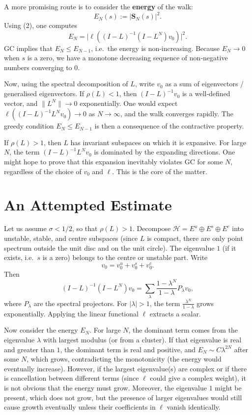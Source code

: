 \documentclass[11pt,a4paper]{article}
\begin{document}
A more promising route is to consider the \textbf{energy} of the walk:
\[
E_N(s) := |\mathbf{S}_N(s)|^2.
\]
Using (2), one computes
\[
E_N = \bigl| \ell( (I - L)^{-1} (I - L^{N}) v_0 ) \bigr|^2.
\tag{7}
\]
GC implies that $E_N \le E_{N-1}$, i.e.\ the energy is non‑increasing.  Because $E_N \to 0$ when $s$ is a zero, we have a monotone decreasing sequence of non‑negative numbers converging to $0$.

Now, using the spectral decomposition of $L$, write $v_0$ as a sum of eigenvectors / generalised eigenvectors.  If $\rho(L) < 1$, then $(I - L)^{-1} v_0$ is a well‑defined vector, and $\|L^{N}\| \to 0$ exponentially.  One would expect $\ell( (I - L)^{-1} L^{N} v_0 ) \to 0$ as $N\to\infty$, and the walk converges rapidly.  The greedy condition $E_N \le E_{N-1}$ is then a consequence of the contractive property.

If $\rho(L) > 1$, then $L$ has invariant subspaces on which it is expansive.  For large $N$, the term $(I - L)^{-1} L^{N} v_0$ is dominated by the expanding directions.  One might hope to prove that this expansion inevitably violates GC for some $N$, regardless of the choice of $v_0$ and $\ell$.  This is the core of the matter.

\section{An Attempted Estimate}
Let us assume $\sigma < 1/2$, so that $\rho(L) > 1$.  Decompose $\mathcal{H} = E^u \oplus E^s \oplus E^c$ into unstable, stable, and centre subspaces (since $L$ is compact, there are only point spectrum outside the unit disc and on the unit circle).  The eigenvalue $1$ (if it exists, i.e.\ $s$ is a zero) belongs to the centre or unstable part.  Write
\[
v_0 = v_0^u + v_0^s + v_0^c.
\]
Then
\[
(I - L)^{-1} (I - L^{N}) v_0
= \sum_{\lambda} \frac{1 - \lambda^{N}}{1 - \lambda} P_\lambda v_0,
\]
where $P_\lambda$ are the spectral projectors.  For $|\lambda| > 1$, the term $\frac{\lambda^{N}}{1 - \lambda}$ grows exponentially.  Applying the linear functional $\ell$ extracts a scalar.

Now consider the energy $E_N$.  For large $N$, the dominant term comes from the eigenvalue $\lambda$ with largest modulus (or from a cluster).  If that eigenvalue is real and greater than $1$, the dominant term is real and positive, and $E_N \sim C \lambda^{2N}$ after some $N$, which grows, contradicting the monotonicity (the energy would eventually increase).  However, if the largest eigenvalue(s) are complex or if there is cancellation between different terms (since $\ell$ could give a complex weight), it is not obvious that the energy must grow.  Moreover, the eigenvalue $1$ might be present, which does not grow, but the presence of larger eigenvalues would still cause growth eventually unless their coefficients in $\ell$ vanish identically.
\end{document}
